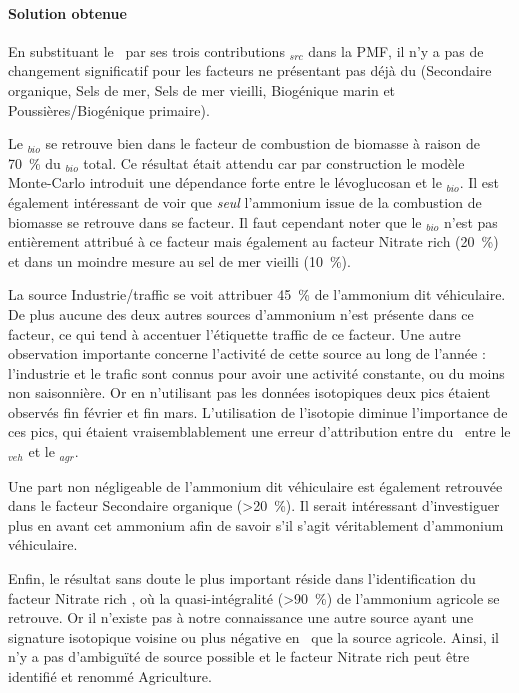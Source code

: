 \paragraph{Solution obtenue}%
\label{par:solution_obtenue}

En substituant le \NHq~par ses trois contributions \NHq$_{src}$ dans la PMF, il n'y a pas
de changement significatif pour les facteurs ne présentant pas déjà du \NHq (Secondaire
organique, Sels de mer, Sels de mer vieilli, Biogénique marin et Poussières/Biogénique
primaire).

Le \NHq$_{bio}$ se retrouve bien dans le facteur de combustion de biomasse à raison de
70~\% du \NHq$_{bio}$ total.
Ce résultat était attendu car par construction le modèle Monte-Carlo introduit une
dépendance forte entre le lévoglucosan et le \NHq$_{bio}$.
Il est également intéressant de voir que \textit{seul} l'ammonium issue de la combustion
de biomasse se retrouve dans se facteur.
Il faut cependant noter que le \NHq$_{bio}$ n'est pas entièrement attribué à ce facteur
mais également au facteur \og Nitrate rich \fg{} (20~\%) et dans un moindre mesure au sel
de mer vieilli (10~\%).

La source Industrie/traffic se voit attribuer 45~\% de l'ammonium dit véhiculaire.
De plus aucune des deux autres sources d'ammonium n'est présente dans ce facteur, ce qui
tend à accentuer l'étiquette \og traffic \fg{} de ce facteur.
Une autre observation importante concerne l'activité de cette source au long de l'année :
l'industrie et le trafic sont connus pour avoir une activité constante, ou du moins non
saisonnière.
Or en n'utilisant pas les données isotopiques deux pics étaient observés fin février et
fin mars.
L'utilisation de l'isotopie diminue l'importance de ces pics, qui étaient
vraisemblablement une erreur d'attribution entre du \NHq~entre le \NHq$_{veh}$ et le
\NHq$_{agr}$.

Une part non négligeable de l'ammonium dit véhiculaire est également retrouvée dans le
facteur Secondaire organique (>20~\%).
Il serait intéressant d'investiguer plus en avant cet ammonium afin de savoir s'il s'agit
véritablement d'ammonium véhiculaire.

Enfin, le résultat sans doute le plus important réside dans l'identification du facteur
\og Nitrate rich \fg, où la quasi-intégralité (>90~\%) de l'ammonium agricole se retrouve.
Or il n'existe pas à notre connaissance une autre source ayant une signature isotopique
voisine ou plus négative en \dN~que la source agricole.
Ainsi, il n'y a pas d'ambiguïté de source possible et le facteur \og Nitrate rich \fg{}
peut être identifié et renommé Agriculture.

